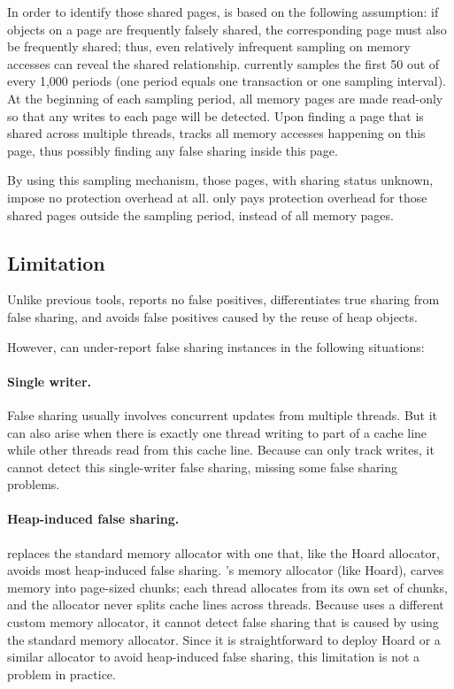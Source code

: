 In order to identify those shared pages, \SheriffDetect{} is based on the following assumption: if objects on a page are frequently falsely shared, the corresponding page must also be frequently shared; thus, even relatively infrequent sampling on memory accesses can reveal the shared relationship. \SheriffDetect{} currently samples the first 50 out of every 1,000 periods (one period equals one transaction or one sampling interval). At the beginning of each sampling period, all memory pages are made read-only so that any
writes to each page will be detected. Upon finding a page that is shared across multiple threads, \SheriffDetect{} tracks all memory accesses happening on this page, thus possibly finding any false sharing inside this page. 

By using this sampling mechanism, those pages, with sharing status unknown, impose no protection overhead at all. \sheriffDetect{} only pays protection overhead for those shared pages outside the sampling period, instead of all memory pages. 

\subsection{Limitation}
\label{discussion:faultofdetect}

Unlike previous tools, \SheriffDetect{} reports no false positives, differentiates true sharing from false sharing, and avoids false positives caused by the reuse of heap objects. 

However, \SheriffDetect{} can under-report false sharing instances in the following situations:

\paragraph{Single writer.}
False sharing usually involves concurrent updates from multiple threads. But it can also arise when there is exactly one thread writing to part of a cache line while other threads read from this cache line. 
Because \sheriffdetect{} can only track writes, it cannot detect this single-writer false sharing, missing some false sharing problems. 

\paragraph{Heap-induced false sharing.}  
\sheriff{} replaces the standard memory allocator with one that, like the Hoard allocator, avoids most heap-induced false sharing. \sheriff{}'s memory allocator (like Hoard), carves memory into page-sized chunks; each thread allocates from its own set of chunks, and the allocator never splits cache lines across threads. Because \SheriffDetect{} uses a different custom memory allocator, it cannot detect false sharing that is caused by using the standard memory allocator. Since it is straightforward to deploy Hoard or a similar allocator to avoid heap-induced false sharing, this limitation is not a problem in practice.

